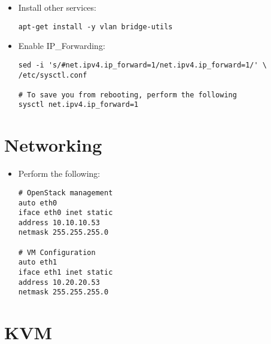 \begin{itemize}
\item Install other services:

\begin{verbatim}
apt-get install -y vlan bridge-utils
\end{verbatim}


\item Enable IP\_Forwarding:

\begin{verbatim}
sed -i 's/#net.ipv4.ip_forward=1/net.ipv4.ip_forward=1/' \
/etc/sysctl.conf

# To save you from rebooting, perform the following
sysctl net.ipv4.ip_forward=1
\end{verbatim}


\end{itemize}

\section{Networking}
\label{networking}

\begin{itemize}
\item Perform the following:

\begin{verbatim}
# OpenStack management
auto eth0
iface eth0 inet static
address 10.10.10.53
netmask 255.255.255.0

# VM Configuration
auto eth1
iface eth1 inet static
address 10.20.20.53
netmask 255.255.255.0
\end{verbatim}


\end{itemize}

\section{KVM}
\label{kvm}

